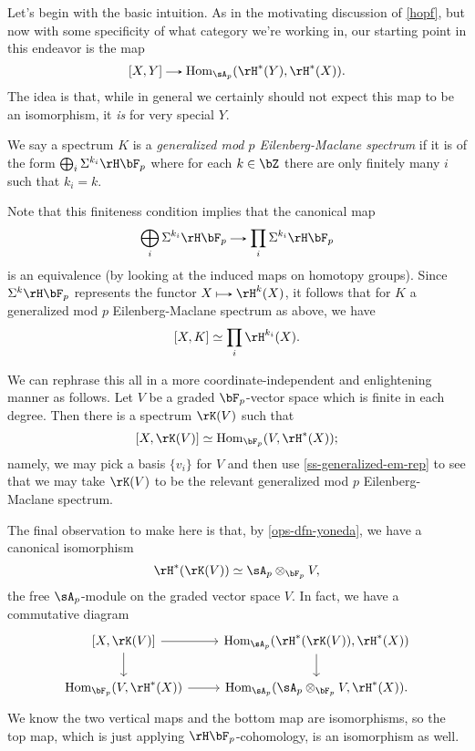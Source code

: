 \begin{nothing}
  \label{ss-intuition}
  Let's begin with the basic intuition. As in the motivating discussion of \cref{hopf}, but now with some specificity of what category we're working in, our starting point in this endeavor is the map
  \[
    [X,Y] \to \Hom_{\sA_p}(\rH^*(Y), \rH^*(X)).
  \]
  The idea is that, while in general we certainly should not expect this map to be an isomorphism, it \emph{is} for very special $Y$.

  \begin{subdefinition}
    \label{ss-generalized-em}
    We say a spectrum $K$ is a \emph{generalized mod $p$ Eilenberg-Maclane spectrum} if it is of the form $\bigoplus_i \Sigma^{k_i} \HFp$ where for each $k \in \bZ$ there are only finitely many $i$ such that $k_i = k$.
  \end{subdefinition}

  \begin{subremark}
    \label{ss-generalized-em-rep}
    Note that this finiteness condition implies that the canonical map
    \[
      \bigoplus_i \Sigma^{k_i} \HFp \to \prod_i \Sigma^{k_i} \HFp
    \]
    is an equivalence (by looking at the induced maps on homotopy groups). Since $\Sigma^k \HFp$ represents the functor $X \mapsto \rH^k(X)$, it follows that for $K$ a generalized mod $p$ Eilenberg-Maclane spectrum as above, we have
    \[
      [X,K] \iso \prod_i \rH^{k_i}(X).
    \]
  \end{subremark}

  \begin{subnothing}
    \label{ss-generalized-em-invariant}
    We can rephrase this all in a more coordinate-independent and enlightening manner as follows. Let $V$ be a graded $\bF_p$-vector space which is finite in each degree. Then there is a spectrum $\rK(V)$ such that
    \[
      [X,\rK(V)] \iso \Hom_{\bF_p}(V,\rH^*(X));
    \]
    namely, we may pick a basis $\{v_i\}$ for $V$ and then use \cref{ss-generalized-em-rep} to see that we may take $\rK(V)$ to be the relevant generalized mod $p$ Eilenberg-Maclane spectrum.
  \end{subnothing}

  \begin{subnothing}
    \label{ss-generalized-em-cohom}
    The final observation to make here is that, by \cref{ops-dfn-yoneda}, we have a canonical isomorphism
    \[
      \rH^*(\rK(V)) \iso \sA_p \otimes_{\bF_p} V,
    \]
    the free $\sA_p$-module on the graded vector space $V$. In fact, we have a commutative diagram
    \[
      \begin{tikzcd}
        {[X,\rK(V)]} \ar[r] \ar[d] &
        \Hom_{\sA_p}(\rH^*(\rK(V)),\rH^*(X)) \ar[d] \\
        \Hom_{\bF_p}(V,\rH^*(X)) \ar[r] &
        \Hom_{\sA_p}(\sA_p \otimes_{\bF_p} V,\rH^*(X)).
      \end{tikzcd}
    \]
    We know the two vertical maps and the bottom map are isomorphisms, so the top map, which is just applying $\HFp$-cohomology, is an isomorphism as well.
  \end{subnothing}


\end{nothing}
